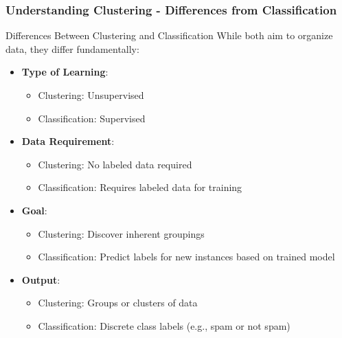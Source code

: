 \documentclass[aspectratio=169]{beamer}
\begin{document}
\begin{frame}[fragile]
    \frametitle{Understanding Clustering - Differences from Classification}
    \begin{block}{Differences Between Clustering and Classification}
        While both aim to organize data, they differ fundamentally:
    \end{block}
    
    \begin{itemize}
        \item \textbf{Type of Learning}:
            \begin{itemize}
                \item Clustering: Unsupervised
                \item Classification: Supervised
            \end{itemize}
        \item \textbf{Data Requirement}:
            \begin{itemize}
                \item Clustering: No labeled data required
                \item Classification: Requires labeled data for training
            \end{itemize}
        \item \textbf{Goal}:
            \begin{itemize}
                \item Clustering: Discover inherent groupings
                \item Classification: Predict labels for new instances based on trained model
            \end{itemize}
        \item \textbf{Output}:
            \begin{itemize}
                \item Clustering: Groups or clusters of data
                \item Classification: Discrete class labels (e.g., spam or not spam)
            \end{itemize}
    \end{itemize}
\end{frame}
\end{document}
